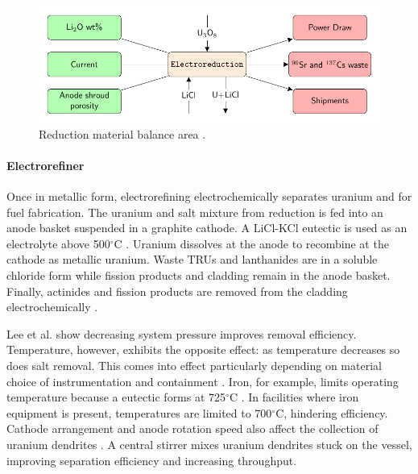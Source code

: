 \begin{figure} 
	\centering
	\includegraphics[width=0.9\linewidth]{images/reduction}
	\caption{Reduction material balance area \cite{lee_advanced_2008}.}
	\label{fig:reduction}
\end{figure}

\paragraph{Electrorefiner}

Once in metallic form, electrorefining electrochemically separates uranium and  for fuel fabrication.
The uranium and salt mixture from reduction is fed into an anode basket suspended in a graphite cathode. 
A LiCl-KCl eutectic is used as an electrolyte above 500$^{\circ}$C \cite{flowsheet_1998,lee_korean_2011}. 
Uranium dissolves at the anode to recombine at the cathode as metallic uranium.
Waste \glspl{TRU} and lanthanides are in a soluble chloride form  while fission products and cladding remain in the anode
basket. Finally, actinides and fission products are removed from the cladding electrochemically \cite{lee_korean_2011}.

Lee et al. \cite{lee_advanced_2008} show decreasing system pressure improves removal efficiency. 
Temperature, however, exhibits the opposite effect: as temperature decreases so does salt removal. This comes into effect 
particularly depending on material choice of instrumentation and containment \cite{lee_advanced_2008}. 
Iron, for example, limits operating temperature because a eutectic forms at 725$^{\circ}$C \cite{chapman_revision_1984}.
In facilities where iron equipment is present, temperatures are limited to 700$^{\circ}$C, hindering efficiency. 
Cathode arrangement and anode rotation speed also affect the collection of uranium 
dendrites \cite{lee_advanced_2008}. A central stirrer mixes uranium dendrites stuck on 
the vessel, improving separation efficiency and increasing throughput. 

